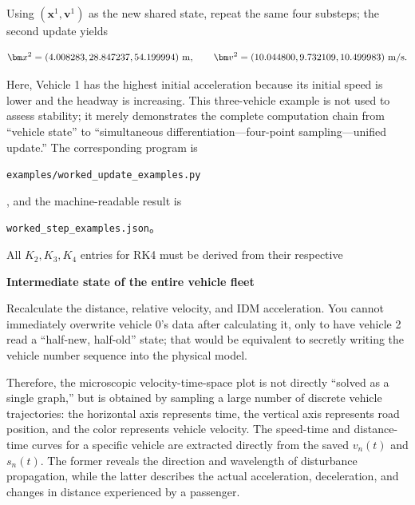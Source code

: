 \documentclass[11pt,a4paper,openany]{book}
\numberwithin{equation}{chapter}
\numberwithin{figure}{chapter}
\numberwithin{table}{chapter}
\begin{document}
Using $(\bm x^1,\bm v^1)$ as the new shared state, repeat the same four substeps; the second update yields

\begin{equation}
\bm x^2=(4.008283,28.847237,54.199994)\ {\rm m},\qquad
\bm v^2=(10.044800,9.732109,10.499983)\ {\rm m/s}.
\label{eq:w01-second-update}
\end{equation}

Here, Vehicle 1 has the highest initial acceleration because its initial speed is lower and the headway is increasing. This three-vehicle example is not used to assess stability; it merely demonstrates the complete computation chain from “vehicle state” to “simultaneous differentiation—four-point sampling—unified update.” The corresponding program is







\texttt{examples/worked\_update\_examples.py}




, and the machine-readable result is







\texttt{worked\_step\_examples.json}。

\begin{tcolorbox}[notebox,title=\textbf{The line most prone to errors}]

All $K_2,K_3,K_4$ entries for RK4 must be derived from their respective




\textbf{Intermediate state of the entire vehicle fleet}




Recalculate the distance, relative velocity, and IDM acceleration. You cannot immediately overwrite vehicle 0’s data after calculating it, only to have vehicle 2 read a “half-new, half-old” state; that would be equivalent to secretly writing the vehicle number sequence into the physical model.







\end{tcolorbox}










Therefore, the microscopic velocity-time-space plot is not directly “solved as a single graph,” but is obtained by sampling a large number of discrete vehicle trajectories: the horizontal axis represents time, the vertical axis represents road position, and the color represents vehicle velocity. The speed-time and distance-time curves for a specific vehicle are extracted directly from the saved $v_n(t)$ and $s_n(t)$. The former reveals the direction and wavelength of disturbance propagation, while the latter describes the actual acceleration, deceleration, and changes in distance experienced by a passenger.
\end{document}
